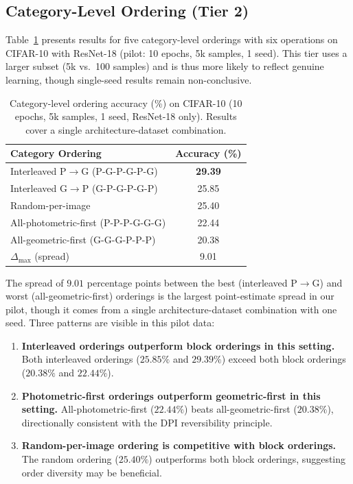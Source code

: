 \documentclass{article}
\begin{document}
\subsection{Category-Level Ordering (Tier 2)}

Table~\ref{tab:tier2} presents results for five category-level orderings with six operations on CIFAR-10 with ResNet-18 (pilot: 10 epochs, 5k samples, 1 seed). This tier uses a larger subset (5k vs.\ 100 samples) and is thus more likely to reflect genuine learning, though single-seed results remain non-conclusive.

\begin{table}[t]
\centering
\caption{Category-level ordering accuracy (\%) on CIFAR-10 (10 epochs, 5k samples, 1 seed, ResNet-18 only). Results cover a single architecture-dataset combination.}
\label{tab:tier2}
\small
\begin{tabular}{lc}
\toprule
\textbf{Category Ordering} & \textbf{Accuracy (\%)} \\
\midrule
Interleaved P$\to$G (P-G-P-G-P-G) & \textbf{29.39} \\
Interleaved G$\to$P (G-P-G-P-G-P) & 25.85 \\
Random-per-image & 25.40 \\
All-photometric-first (P-P-P-G-G-G) & 22.44 \\
All-geometric-first (G-G-G-P-P-P) & 20.38 \\
\midrule
$\Delta_{\max}$ (spread) & 9.01 \\
\bottomrule
\end{tabular}
\end{table}

The spread of $9.01$ percentage points between the best (interleaved P$\to$G) and worst (all-geometric-first) orderings is the largest point-estimate spread in our pilot, though it comes from a single architecture-dataset combination with one seed. Three patterns are visible in this pilot data:
\begin{enumerate}
\item \textbf{Interleaved orderings outperform block orderings in this setting.} Both interleaved orderings ($25.85\%$ and $29.39\%$) exceed both block orderings ($20.38\%$ and $22.44\%$).
\item \textbf{Photometric-first orderings outperform geometric-first in this setting.} All-photometric-first ($22.44\%$) beats all-geometric-first ($20.38\%$), directionally consistent with the DPI reversibility principle.
\item \textbf{Random-per-image ordering is competitive with block orderings.} The random ordering ($25.40\%$) outperforms both block orderings, suggesting order diversity may be beneficial.
\end{enumerate}
\end{document}
